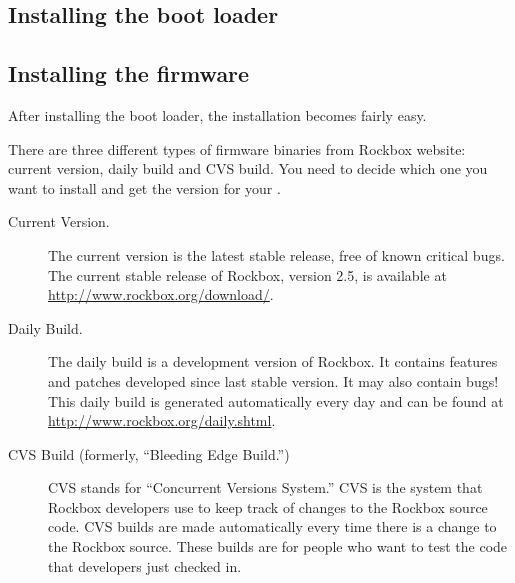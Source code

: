 {  \subsection{Installing the boot loader}

  \subsection{Installing the firmware} 
  After installing the boot loader, the installation becomes fairly easy. 
} 
      
There are three different types of firmware binaries from Rockbox website:
\label{Version} 
current version, daily build and CVS build. You need to decide which one
you want to install and get the version for your \dap{}.

\begin{description}

\item[Current Version.] The current version is the latest stable release, free 
  of known critical bugs.  The current stable release of Rockbox, version 2.5, 
  is available at \url{http://www.rockbox.org/download/}.
  
\item[Daily Build.] The daily build is a development version of Rockbox. It
  contains features and patches developed since last stable version.  It 
  may also contain bugs! This daily build is generated automatically every day 
  and can be found at \url{http://www.rockbox.org/daily.shtml}.
  
\item[CVS Build (formerly, ``Bleeding Edge Build.'')] CVS stands for 
  ``Concurrent Versions System.'' CVS is the system that Rockbox 
  developers use to keep track of changes to the Rockbox source code. CVS 
  builds are made automatically every time there is a change to the 
  Rockbox source. These builds are for people who want to test the code 
  that developers just checked in. 
  
\end{description}

